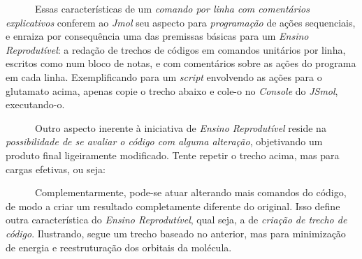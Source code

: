 \documentclass[
  letterpaper,
  DIV=11,
  numbers=noendperiod]{scrreprt}
\newenvironment{Shaded}{\begin{snugshade}}{\end{snugshade}}
\newcommand{\CommentTok}[1]{\textcolor[rgb]{0.37,0.37,0.37}{#1}}
\newcommand{\NormalTok}[1]{\textcolor[rgb]{0.00,0.23,0.31}{#1}}
\newcommand{\SpecialCharTok}[1]{\textcolor[rgb]{0.37,0.37,0.37}{#1}}
\begin{document}
~~~~~~Essas características de um \emph{comando por linha com
comentários explicativos} conferem ao \emph{Jmol} seu aspecto para
\emph{programação} de ações sequenciais, e enraiza por consequência uma
das premissas básicas para um \emph{Ensino Reprodutível}: a redação de
trechos de códigos em comandos unitários por linha, escritos como num
bloco de notas, e com comentários sobre as ações do programa em cada
linha. Exemplificando para um \emph{script} envolvendo as ações para o
glutamato acima, apenas copie o trecho abaixo e cole-o no \emph{Console}
do \emph{JSmol}, executando-o.

\begin{Shaded}
\end{Shaded}

~~~~~~Outro aspecto inerente à iniciativa de \emph{Ensino Reprodutível}
reside na \emph{possibilidade de se avaliar o código com alguma
alteração}, objetivando um produto final ligeiramente modificado. Tente
repetir o trecho acima, mas para cargas efetivas, ou seja:

\begin{Shaded}
\end{Shaded}

~~~~~~Complementarmente, pode-se atuar alterando mais comandos do
código, de modo a criar um resultado completamente diferente do
original. Isso define outra característica do \emph{Ensino
Reprodutível}, qual seja, a de \emph{criação de trecho de código}.
Ilustrando, segue um trecho baseado no anterior, mas para minimização de
energia e reestruturação dos orbitais da molécula.

\begin{Shaded}
\end{Shaded}
\end{document}
